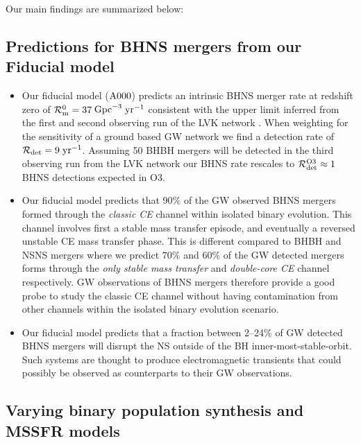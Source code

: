 \documentclass[twocolumn]{aastex63}
\newcommand\bhnsSingle{BHNS\xspace}
\newcommand{\yearmin}{\ensuremath{\,\rm{yr}^{-1}}\xspace}
\newcommand{\GpcminThree}{\ensuremath{\,\rm{Gpc}^{-3}}\xspace}
\newcommand{\mAzero}{\ensuremath{\rm{A}000}\xspace}
\newcommand{\RateIntrinsicZero}{\ensuremath{\mathcal{R}_{\rm{m}}^{0}}\xspace}
\newcommand{\RateObserved}{\ensuremath{\mathcal{R}_{\rm{det}}}\xspace}
\newcommand{\RateIntrinsicAzeroBHNS}{\ensuremath{37}\xspace}
\newcommand{\RateObservedAzeroBHNS}{\ensuremath{9}\xspace}
\begin{document}
Our main findings  are summarized below:



\subsection{Predictions for \bhnsSingle mergers from our Fiducial model}

\begin{itemize}
\item Our fiducial model (\mAzero) predicts an intrinsic  \bhnsSingle merger rate at redshift zero of $\RateIntrinsicZero = \RateIntrinsicAzeroBHNS $\GpcminThree \yearmin  consistent with the upper limit inferred from the first and second observing run of the LVK network   \citep{2019PhRvX...9c1040A}. When weighting for the sensitivity  of a ground based \ac{GW} network we find a detection rate of $\RateObserved = \RateObservedAzeroBHNS $\yearmin. 
Assuming 50 \ac{BHBH} mergers will be detected in the third observing run from the LVK network our \bhnsSingle rate rescales to $\RateObserved^{\rm{O3}} \approx 1 $ \bhnsSingle detections expected in O3. 


\item  Our fiducial model predicts that 90$\%$ of  the \ac{GW} observed \bhnsSingle mergers formed through the \textit{classic CE} channel within isolated binary evolution. This channel involves  first a stable mass transfer episode, and eventually a reversed  unstable \ac{CE} mass transfer phase. 
This is different compared to \ac{BHBH} and \ac{NSNS} mergers where we predict $70\%$ and $60\%$ of the \ac{GW} detected mergers forms through the \textit{only stable mass transfer} and \textit{double-core \ac{CE}} channel respectively. 
\ac{GW} observations of \bhnsSingle mergers  therefore provide a good probe to study the classic \ac{CE} channel without having contamination from other channels within the isolated binary evolution scenario. 

\item Our fiducial model predicts that a fraction between 2--24$\%$ of \ac{GW} detected \bhnsSingle mergers will disrupt the \ac{NS} outside of the \ac{BH} inner-most-stable-orbit. Such systems are thought to produce electromagnetic transients that could possibly be observed as counterparts to their \ac{GW} observations. 
\end{itemize}





\subsection{Varying binary population synthesis and \ac{MSSFR} models}
\end{document}
